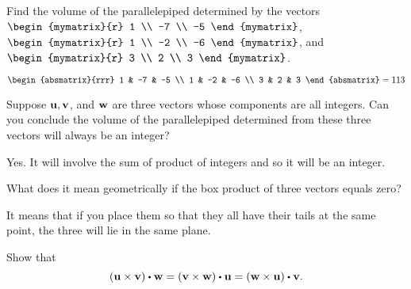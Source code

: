 \begin{enumialphparenastyle}

\begin{ex} Find the volume of the parallelepiped determined by the vectors
$\begin{mymatrix}{r}
1 \\
-7 \\
-5
\end{mymatrix} $, \\
 $\begin{mymatrix}{r}
1 \\
-2 \\
-6
\end{mymatrix}$, and $\begin{mymatrix}{r}
3 \\
2 \\
3
\end{mymatrix}$.
\begin{sol}
 $\begin{absmatrix}{rrr}
1 & -7 & -5 \\
1 & -2 & -6 \\
3 & 2 & 3
\end{absmatrix}= 113$
\end{sol}
\end{ex}

\begin{ex} Suppose $\mbox{\bf u},\mbox{\bf v}$, and $\mbox{\bf w}$ are three vectors whose
components are all integers. Can you conclude the volume of the
parallelepiped determined from these three vectors will always be an integer?
\begin{sol}
Yes. It will involve the sum of product of integers and so it will
be an integer.
\end{sol}
\end{ex}

\begin{ex} \label{exer-box-product-zero}
  What does it mean geometrically if the box product of three vectors
  equals zero?
  \begin{sol}
    It means that if you place them so that they all have their tails
    at the same point, the three will lie in the same plane.
  \end{sol}
\end{ex}

\begin{ex} Show that 
  \begin{equation*}
    \tup{\vect{u}\times \vect{v}} \dotprod \vect{w}=
    \tup{\vect{v}\times \vect{w}} \dotprod \vect{u}=
    \tup{\vect{w}\times \vect{u}} \dotprod \vect{v}.
  \end{equation*}
\end{ex}


\end{enumialphparenastyle}
